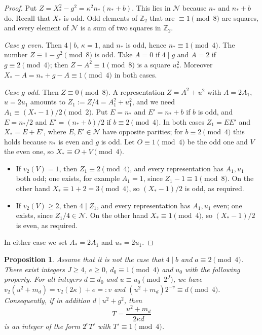 \documentclass[11pt]{amsart}
\newtheorem{proposition}[theorem]{Proposition}
\theoremstyle{remark}
\theoremstyle{definition}
\numberwithin{equation}{section}
\newcommand{\Nc}{\mathcal{N}}
\newcommand{\Zt}{\mathbb{Z}_2}
\begin{document}
\begin{proof}
Put $Z=X_*^2-g^2=\kappa^2n_*(n_*+b)$. This lies in $\Nc$ because $n_*$ and $n_*+b$ do. Recall that $X_*$ is odd. Odd elements of $\Zt$ that are $\equiv1\pmod 8$ are squares, and every element of $\Nc$ is a sum of two squares in $\Zt$.

\emph{Case $g$ even.} Then $4\mid b$, $\kappa=1$, and $n_*$ is odd, hence $n_*\equiv1\pmod 4$. The number $Z\equiv1-g^2\pmod 8$ is odd. Take $A=0$ if $4\mid g$ and $A=2$ if $g\equiv2\pmod4$; then $Z-A^2\equiv1\pmod 8$ is a square $u_*^2$. Moreover $X_*-A=n_*+g-A\equiv1\pmod 4$ in both cases.

\emph{Case $g$ odd.} Then $Z\equiv0\pmod 8$. A representation $Z=A^2+u^2$ with $A=2A_1$, $u=2u_1$ amounts to $Z_1:=Z/4=A_1^2+u_1^2$, and we need $A_1\equiv(X_*-1)/2\pmod 2$. Put $E=n_*$ and $E'=n_*+b$ if $b$ is odd, and $E=n_*/2$ and $E'=(n_*+b)/2$ if $b\equiv 2\pmod 4$. In both cases $Z_1=EE'$ and $X_*=E+E'$, where $E,E'\in\Nc$ have opposite parities; for $b\equiv2\pmod4$ this holds because $n_*$ is even and $g$ is odd. Let $O\equiv1\pmod 4$ be the odd one and $V$ the even one, so $X_*\equiv O+V\pmod 4$.
\begin{itemize}
\item If $v_2(V)=1$, then $Z_1\equiv2\pmod 4$, and every representation has $A_1,u_1$ both odd; one exists, for example $A_1=1$, since $Z_1-1\equiv1\pmod 8$. On the other hand $X_*\equiv1+2=3\pmod4$, so $(X_*-1)/2$ is odd, as required.
\item If $v_2(V)\ge2$, then $4\mid Z_1$, and every representation has $A_1,u_1$ even; one exists, since $Z_1/4\in\Nc$. On the other hand $X_*\equiv1\pmod 4$, so $(X_*-1)/2$ is even, as required.
\end{itemize}
In either case we set $A_*=2A_1$ and $u_*=2u_1$.
\end{proof}

\begin{proposition}\label{prop:seed}
Assume that it is not the case that $4\mid b$ and $a\equiv2\pmod 4$. There exist integers $J\ge4$, $e\ge0$, $d_0\equiv1\pmod 4$ and $u_0$ with the following property. For all integers $d\equiv d_0$ and $u\equiv u_0\pmod{2^J}$, we have $v_2(u^2+m_d)=v_2(2\kappa)+e=:v$ and $(u^2+m_d)2^{-v}\equiv d\pmod 4$. Consequently, if in addition $d\mid u^2+g^2$, then
\[
T=\frac{u^2+m_d}{2\kappa d}
\]
is an integer of the form $2^eT'$ with $T'\equiv1\pmod 4$.
\end{proposition}
\end{document}
